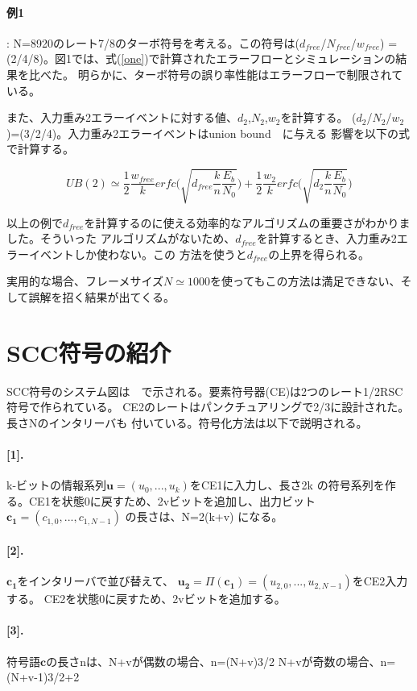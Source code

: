 \documentclass[20 pts]{article}
\begin{document}
\paragraph{例1}:
N=8920のレート7/8のターボ符号を考える。この符号は($d_{free}$/$N_{free}$/$w_{free}$)
= (2/4/8)。図1では、式(\ref{one})で計算されたエラーフローとシミュレーションの結果を比べた。
明らかに、ターボ符号の誤り率性能はエラーフローで制限されている。

また、入力重み2エラーイベントに対する値、$d_{2}$,$N_{2}$,$w_{2}$を計算する。
($d_{2}$/$N_{2}$/$w_{2}$)=(3/2/4)。入力重み2エラーイベントはunion bound　に与える
影響を以下の式で計算する。

$$UB(2) \simeq \frac{1}{2} \frac{w_{free}}{k}erfc\Big ( \sqrt{d_{free}\frac{k}{n}\frac{E_b}{N_0}}\Big) + \frac{1}{2} \frac{w_{2}}{k}erfc\Big ( \sqrt{d_{2}\frac{k}{n}\frac{E_b}{N_0}}\Big)$$

以上の例で$d_{free}$を計算するのに使える効率的なアルゴリズムの重要さがわかりました。そういった
アルゴリズムがないため、$d_{free}$を計算するとき、入力重み2エラーイベントしか使わない。この
方法を使うと$d_{free}$の上界を得られる。

実用的な場合、フレーメサイズ$N\simeq 1000$を使ってもこの方法は満足できない、そして誤解を招く結果が出てくる。

\section{SCC符号の紹介}
SCC符号のシステム図は　で示される。要素符号器(CE)は2つのレート1/2RSC符号で作られている。
CE2のレートはパンクチュアリングで2/3に設計された。長さNのインタリーバも
付いている。符号化方法は以下で説明される。
\paragraph{[1].}k-ビットの情報系列$\mathbf{u}=(u_0,...,u_k)$をCE1に入力し、長さ2k
の符号系列を作る。CE1を状態0に戻すため、2vビットを追加し、出力ビット
$\mathbf{c_1}=(c_{1,0},...,c_{1,N-1})$
の長さは、N=2(k+v)
になる。

\paragraph{[2].}$\mathbf{c_1}$をインタリーバで並び替えて、
$\mathbf{u_2}=\Pi(\mathbf{c_1})=(u_{2,0},...,u_{2,N-1})$をCE2入力する。
CE2を状態0に戻すため、2vビットを追加する。

\paragraph{[3].}符号語$\mathbf{c}$の長さnは、N+vが偶数の場合、n=(N+v)3/2
N+vが奇数の場合、n=(N+v-1)3/2+2
\end{document}
